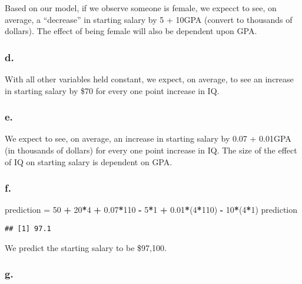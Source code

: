 \documentclass[]{article}
\newenvironment{Shaded}{\begin{snugshade}}{\end{snugshade}}
\newcommand{\DecValTok}[1]{\textcolor[rgb]{0.00,0.00,0.81}{#1}}
\newcommand{\FloatTok}[1]{\textcolor[rgb]{0.00,0.00,0.81}{#1}}
\newcommand{\NormalTok}[1]{#1}
\newcommand{\OperatorTok}[1]{\textcolor[rgb]{0.81,0.36,0.00}{\textbf{#1}}}
\newcommand{\StringTok}[1]{\textcolor[rgb]{0.31,0.60,0.02}{#1}}
\begin{document}
Based on our model, if we observe someone is female, we expecct to see,
on average, a ``decrease'' in starting salary by 5 + 10GPA (convert to
thousands of dollars). The effect of being female will also be dependent
upon GPA.

\hypertarget{d.}{%
\subsubsection{d.}\label{d.}}

With all other variables held constant, we expect, on average, to see an
increase in starting salary by \$70 for every one point increase in IQ.

\hypertarget{e.}{%
\subsubsection{e.}\label{e.}}

We expect to see, on average, an increase in starting salary by 0.07 +
0.01GPA (in thousands of dollars) for every one point increase in IQ.
The size of the effect of IQ on starting salary is dependent on GPA.

\hypertarget{f.}{%
\subsubsection{f.}\label{f.}}

\begin{Shaded}
\begin{Highlighting}[]
\NormalTok{prediction =}\StringTok{ }\DecValTok{50} \OperatorTok{+}\StringTok{ }\DecValTok{20}\OperatorTok{*}\DecValTok{4} \OperatorTok{+}\StringTok{ }\FloatTok{0.07}\OperatorTok{*}\DecValTok{110} \OperatorTok{-}\StringTok{ }\DecValTok{5}\OperatorTok{*}\DecValTok{1} \OperatorTok{+}\StringTok{ }\FloatTok{0.01}\OperatorTok{*}\NormalTok{(}\DecValTok{4}\OperatorTok{*}\DecValTok{110}\NormalTok{) }\OperatorTok{-}\StringTok{ }\DecValTok{10}\OperatorTok{*}\NormalTok{(}\DecValTok{4}\OperatorTok{*}\DecValTok{1}\NormalTok{)}
\NormalTok{prediction}
\end{Highlighting}
\end{Shaded}

\begin{verbatim}
## [1] 97.1
\end{verbatim}

We predict the starting salary to be \$97,100.

\hypertarget{g.}{%
\subsubsection{g.}\label{g.}}
\end{document}
